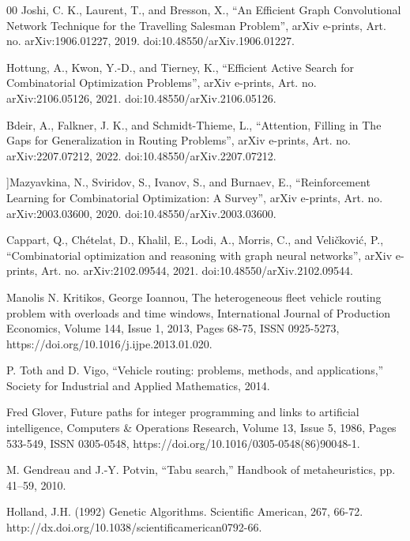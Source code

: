 \documentclass[journal,twoside,web]{ieeecolor}
\theoremstyle{definition}
\theoremstyle{remark}
\theoremstyle{definition}
\begin{document}
\begin{thebibliography}{00}
Joshi, C. K., Laurent, T., and Bresson, X., “An Efficient Graph Convolutional Network Technique for the Travelling Salesman Problem”, arXiv e-prints, Art. no. arXiv:1906.01227, 2019. doi:10.48550/arXiv.1906.01227.

Hottung, A., Kwon, Y.-D., and Tierney, K., “Efficient Active Search for Combinatorial Optimization Problems”, arXiv e-prints, Art. no. arXiv:2106.05126, 2021. doi:10.48550/arXiv.2106.05126.

Bdeir, A., Falkner, J. K., and Schmidt-Thieme, L., “Attention, Filling in The Gaps for Generalization in Routing Problems”, arXiv e-prints, Art. no. arXiv:2207.07212, 2022. doi:10.48550/arXiv.2207.07212.

]Mazyavkina, N., Sviridov, S., Ivanov, S., and Burnaev, E., “Reinforcement Learning for Combinatorial Optimization: A Survey”, arXiv e-prints, Art. no. arXiv:2003.03600, 2020. doi:10.48550/arXiv.2003.03600.

Cappart, Q., Chételat, D., Khalil, E., Lodi, A., Morris, C., and Veličković, P., “Combinatorial optimization and reasoning with graph neural networks”, arXiv e-prints, Art. no. arXiv:2102.09544, 2021. doi:10.48550/arXiv.2102.09544.

Manolis N. Kritikos, George Ioannou,
The heterogeneous fleet vehicle routing problem with overloads and time windows,
International Journal of Production Economics,
Volume 144, Issue 1,
2013,
Pages 68-75,
ISSN 0925-5273,
https://doi.org/10.1016/j.ijpe.2013.01.020.

P. Toth and D. Vigo, “Vehicle routing: problems, methods, and applications,” Society for Industrial and Applied Mathematics, 2014.

Fred Glover,
Future paths for integer programming and links to artificial intelligence,
Computers & Operations Research,
Volume 13, Issue 5,
1986,
Pages 533-549,
ISSN 0305-0548,
https://doi.org/10.1016/0305-0548(86)90048-1.

M. Gendreau and J.-Y. Potvin, “Tabu search,” Handbook of metaheuristics, pp. 41–59, 2010.

Holland, J.H. (1992) Genetic Algorithms. Scientific American, 267, 66-72.
http://dx.doi.org/10.1038/scientificamerican0792-66.


\end{thebibliography}
\end{document}
